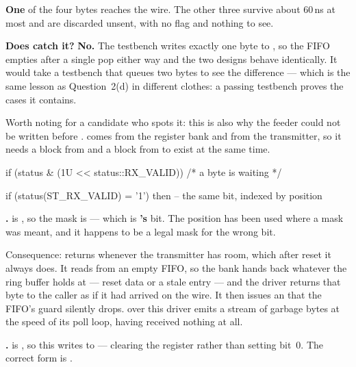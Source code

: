 \textbf{One} of the four bytes reaches the wire. The other three survive about 60\,ns at most and are
discarded unsent, with no flag and nothing to see. 

\textbf{Does  catch it?} \textbf{No.} The testbench writes exactly one byte to
, so the FIFO empties after a single pop either way and the two designs behave
identically. It would take a testbench that queues two bytes to see the difference --- which is the
same lesson as Question~2(d) in different clothes: a passing testbench proves the cases it contains.

Worth noting for a candidate who spots it: this is also why the feeder could not be written before
.  comes from the register bank and  from the transmitter,
so it needs a block from  and a block from  to exist at the same time.


\begin{cppcode}
if (status & (1U << status::RX_VALID)) { /* a byte is waiting */ }
\end{cppcode}

\begin{vhdlcode}
if (status(ST_RX_VALID) = '1') then -- the same bit, indexed by position
\end{vhdlcode}

\textbf{.}  is , so the mask is
 --- which is \textbf{'s} bit. The position has been used where a mask was
meant, and it happens to be a legal mask for the wrong bit.

Consequence:  returns  whenever the transmitter has room, which after reset
it always does. It reads  from an empty FIFO, so the bank hands back whatever the ring
buffer holds at  --- reset data or a stale entry --- and the driver returns that byte to
the caller as if it had arrived on the wire. It then issues an  that the FIFO's
 guard silently drops.  over this driver emits a stream of
garbage bytes at the speed of its poll loop, having received nothing at all. 

\textbf{.}  is , so this writes
 to  --- clearing the register rather than setting bit~0. The correct
form is .

